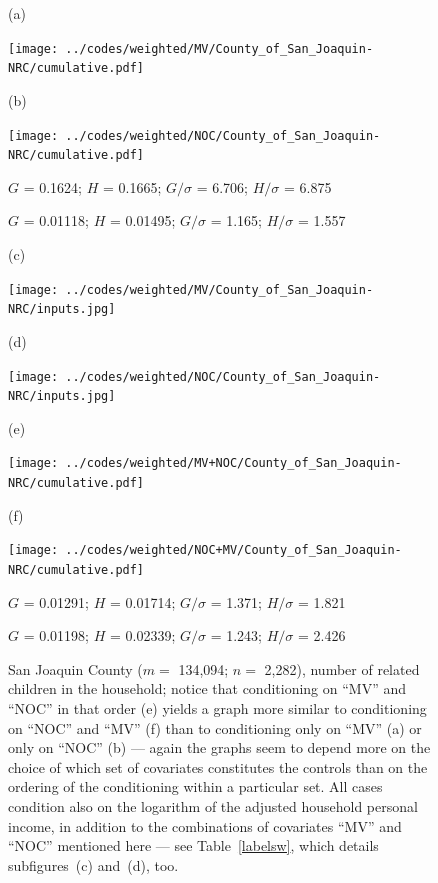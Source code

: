 \documentclass{article}
\newlength{\vertsep}
\newlength{\imsize}
\newlength{\imsized}
\begin{document}
\begin{figure}
\begin{centering}

(a) \parbox{\imsize}{\texttt{[image: ../codes/weighted/MV/County\_of\_San\_Joaquin-NRC/cumulative.pdf]}}
\quad\quad
(b) \parbox{\imsize}{\texttt{[image: ../codes/weighted/NOC/County\_of\_San\_Joaquin-NRC/cumulative.pdf]}}

\parbox{\imsized}{\hfil \footnotesize $G$ = 0.1624; $H$ = 0.1665;
$G/\sigma$ = 6.706; $H/\sigma$ = 6.875}
\parbox{\imsized}{\hfil \footnotesize $G$ = 0.01118; $H$ = 0.01495;
$G/\sigma$ = 1.165; $H/\sigma$ = 1.557}

\vspace{\vertsep}

(c) \parbox{\imsize}{\texttt{[image: ../codes/weighted/MV/County\_of\_San\_Joaquin-NRC/inputs.jpg]}}
\quad\quad
(d) \parbox{\imsize}{\texttt{[image: ../codes/weighted/NOC/County\_of\_San\_Joaquin-NRC/inputs.jpg]}}

\vspace{\vertsep}

(e) \parbox{\imsize}{\texttt{[image: ../codes/weighted/MV+NOC/County\_of\_San\_Joaquin-NRC/cumulative.pdf]}}
\quad\quad
(f) \parbox{\imsize}{\texttt{[image: ../codes/weighted/NOC+MV/County\_of\_San\_Joaquin-NRC/cumulative.pdf]}}

\parbox{\imsized}{\hfil \footnotesize $G$ = 0.01291; $H$ = 0.01714;
$G/\sigma$ = 1.371; $H/\sigma$ = 1.821}
\parbox{\imsized}{\hfil \footnotesize $G$ = 0.01198; $H$ = 0.02339;
$G/\sigma$ = 1.243; $H/\sigma$ = 2.426}

\end{centering}
\caption{San Joaquin County ($m =$ 134,094; $n =$ 2,282),
number of related children in the household;
notice that conditioning on ``MV'' and ``NOC'' in that order (e)
yields a graph more similar to conditioning on ``NOC'' and ``MV'' (f)
than to conditioning only on ``MV'' (a) or only on ``NOC'' (b) ---
again the graphs seem to depend more on the choice
of which set of covariates constitutes the controls
than on the ordering of the conditioning within a particular set.
All cases condition also on the logarithm
of the adjusted household personal income, in addition to the combinations
of covariates ``MV'' and ``NOC'' mentioned here --- see Table~\ref{labelsw},
which details subfigures~(c) and~(d), too.}
\label{san_joaquin}
\end{figure}
\end{document}
